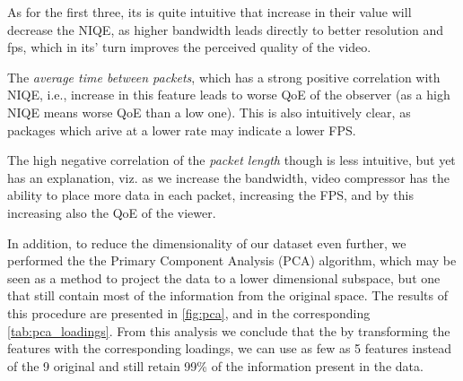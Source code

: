 As for the first three, its is quite intuitive that increase in their value will decrease the NIQE, as higher bandwidth leads directly to better resolution and fps, which in its' turn improves the perceived quality of the video. 

The \emph{average time between packets}, which has a strong positive correlation with NIQE, i.e., increase in this feature leads to worse QoE of the observer (as a high NIQE means worse QoE than a low one). This is also intuitively clear, as packages which arive at a lower rate may indicate a lower FPS.

The high negative correlation of the \emph{packet length} though is less intuitive, but yet has an explanation, viz. as we increase the bandwidth, video compressor has the ability to place more data in each packet, increasing the FPS, and by this increasing also the QoE of the viewer.

In addition, to reduce the dimensionality of our dataset even further, we performed the the Primary Component Analysis (PCA) \cite{pearson1901liii} algorithm, which may be seen as a method to project the data to a lower dimensional subspace, but one that still contain most of the information from the original space. The results of this procedure are presented in \cref{fig:pca}, and in the corresponding \cref{tab:pca_loadings}.
From this analysis we conclude that the by transforming the features with the corresponding loadings, we can use as few as 5 features instead of the 9 original and still retain 99\% of the information present in the data.


